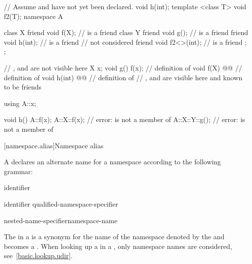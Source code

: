 \begin{codeblock}
// Assume  and  have not yet been declared.
void h(int);
template <class T> void f2(T);
namespace A {
  class X {
    friend void f(X);           //  is a friend
    class Y {
      friend void g();          //  is a friend
      friend void h(int);       //  is a friend
                                //  not considered
      friend void f2<>(int);    //  is a friend
    };
  };

  // ,  and  are not visible here
  X x;
  void g() { f(x); }            // definition of 
  void f(X) @@       // definition of 
  void h(int) @@    // definition of 
  // ,  and  are visible here and known to be friends
}

using A::x;

void h() {
  A::f(x);
  A::X::f(x);                   // error:  is not a member of 
  A::X::Y::g();                 // error:  is not a member of 
}
\end{codeblock}
\exitexample

[namespace.alias]{Namespace alias}%
%
%

\pnum
A  declares an alternate name for a
namespace according to the following grammar:

\begin{bnf}
\br
        identifier
\end{bnf}

\begin{bnf}
\br
         identifier \terminal{=} qualified-namespace-specifier \terminal{;}
\end{bnf}

\begin{bnf}
\br
    nested-name-specifier\opt namespace-name
\end{bnf}

\pnum
The  in a  is
a synonym for the name of the namespace denoted by the
 and becomes a
.
\enternote
When looking up a  in a
, only namespace names are
considered, see~\ref{basic.lookup.udir}.
\exitnote

